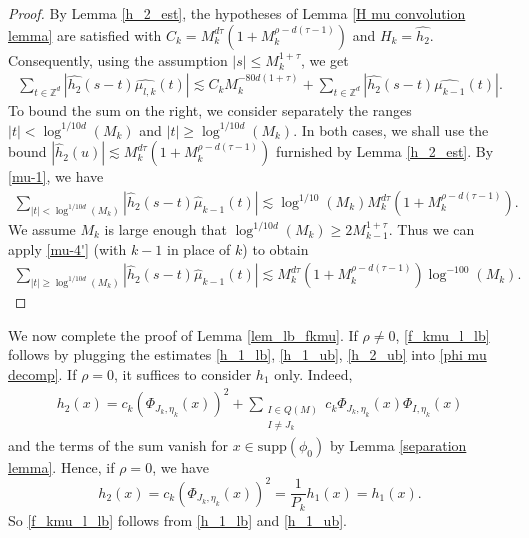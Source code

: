 \documentclass{amsart}
\numberwithin{equation}{section}
\theoremstyle{definition}
\theoremstyle{definition}
\def\ZZ{\mathbb{Z}}
\def\supp{\mathrm{supp}}
\begin{document}
\begin{proof}
By Lemma \ref{h_2_est}, the hypotheses of Lemma \ref{H mu convolution lemma} are satisfied with 
$C_k = M_k^{d \tau} (1 + M_k^{\rho-d(\tau-1)})$ and $H_k = \widehat{h_2}$.  
Consequently, using the assumption $|s| \leq M_k^{1+\tau}$, we get 
\begin{align*}
\sum_{t \in \ZZ^d }|\widehat{h_2} (s-t) \widehat{\mu_{l,k}} (t) | 
\lesssim 
C_k M_k^{-80d(1+\tau)} 
+ 
\sum_{t \in \ZZ^d }
|\widehat{h_2} (s-t) 
\widehat{\mu_{k-1}} (t)|.  
\end{align*}
To bound the sum on the right, we consider separately the ranges $|t| < \log^{1/10d}(M_k)$ and $|t| \geq  \log^{1/10d}(M_k)$.  
In both cases, we shall use the bound  $|\widehat{h}_2(u)| \lesssim  M_k^{d\tau} (1+ M_k^{\rho -d(\tau-1)})$ furnished by Lemma \ref{h_2_est}. 
By \eqref{mu-1}, we have
\begin{align*}
\sum_{|t| < \log^{1/10d}(M_k)} |\widehat{h}_2(s-t) \widehat{\mu}_{k-1}(t)| 
\lesssim  \log^{1/10}(M_k) M_k^{d\tau} (1+ M_k^{\rho -d(\tau-1)}). 
\end{align*}
We assume $M_k$ is large enough that $\log^{1/10d}(M_k) \geq 2M_{k-1}^{1+\tau}$. 
Thus we can apply \eqref{mu-4'} (with $k-1$ in place of $k$) to obtain 
\begin{align*}
\sum_{|t| \geq \log^{1/10d}(M_k)} |\widehat{h}_2(s-t) \widehat{\mu}_{k-1}(t)| 
\lesssim M_k^{d\tau} (1+ M_k^{\rho -d(\tau-1)})\log^{-100}(M_k).
\end{align*}
\end{proof}



We now complete the proof of Lemma \ref{lem_lb_fkmu}. If $\rho \neq 0$, \eqref{f_kmu_l_lb} follows by plugging the estimates \eqref{h_1_lb}, \eqref{h_1_ub}, \eqref{h_2_ub} into 
\ref{phi mu decomp}. 
If $\rho =0$, it suffices to consider $h_1$ only. Indeed, 
\begin{align*}
h_2(x)
= 
c_k (\Phi_{J_k, \eta_k}(x))^2
+ 
\sum_{\substack{I \in Q(M) \\ I \neq J_k}} c_k \Phi_{J_k, \eta_k}(x) \Phi_{I, \eta_k}(x) 
\end{align*}
and the terms of the sum vanish  for $x \in \supp(\phi_0)$ by Lemma \ref{separation lemma}. Hence, if $\rho = 0$, we have
\[h_2(x) = c_k (\Phi_{J_k, \eta_k}(x))^2 = \frac{1}{P_k}  h_1(x) =  h_1(x). \]
So \eqref{f_kmu_l_lb} follows from \eqref{h_1_lb} and \eqref{h_1_ub}.
\end{document}
